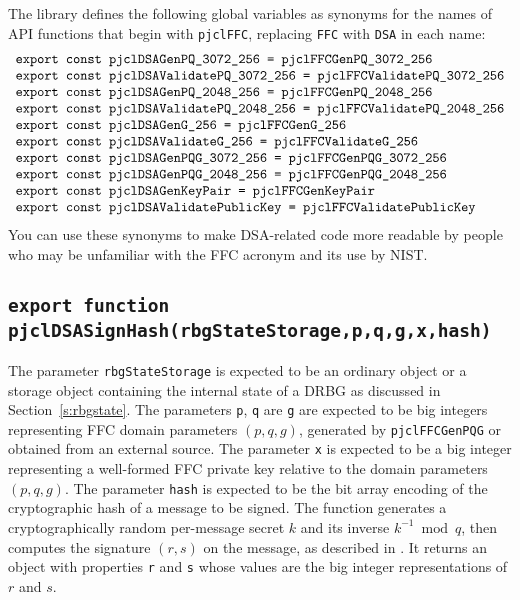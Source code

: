 \documentclass[12pt]{article}
\begin{document}
The library defines the following global variables as 
synonyms for the names of API functions that begin with {\tt pjclFFC},
replacing {\tt FFC} with {\tt DSA} in each name:
$$
\begin{array}{l}
\mbox{\tt export const pjclDSAGenPQ\_3072\_256 = pjclFFCGenPQ\_3072\_256}\\
\mbox{\tt export const pjclDSAValidatePQ\_3072\_256 = pjclFFCValidatePQ\_3072\_256}\\
\mbox{\tt export const pjclDSAGenPQ\_2048\_256 = pjclFFCGenPQ\_2048\_256}\\
\mbox{\tt export const pjclDSAValidatePQ\_2048\_256 = pjclFFCValidatePQ\_2048\_256}\\
\mbox{\tt export const pjclDSAGenG\_256 = pjclFFCGenG\_256}\\
\mbox{\tt export const pjclDSAValidateG\_256 = pjclFFCValidateG\_256}\\
\mbox{\tt export const pjclDSAGenPQG\_3072\_256 = pjclFFCGenPQG\_3072\_256}\\
\mbox{\tt export const pjclDSAGenPQG\_2048\_256 = pjclFFCGenPQG\_2048\_256}\\
\mbox{\tt export const pjclDSAGenKeyPair = pjclFFCGenKeyPair}\\
\mbox{\tt export const pjclDSAValidatePublicKey = pjclFFCValidatePublicKey}
\end{array}
$$
You can use these synonyms to make DSA-related code more readable by people 
who may be unfamiliar with the FFC acronym and its use
by NIST.

\subsection{\tt export function pjclDSASignHash(rbgStateStorage,p,q,g,x,hash)}

The parameter {\tt rbgStateStorage} is expected to be an ordinary
object or a storage object containing the internal state of a DRBG 
as discussed in Section~\ref{s:rbgstate}.
The parameters {\tt p}, {\tt q} are {\tt g}
are expected to be big integers representing FFC domain parameters $(p,q,g)$,
generated by {\tt pjclFFCGenPQG} or obtained from an external source.
The parameter {\tt x} is expected to be a big integer representing a 
well-formed FFC private key relative to the domain parameters $(p,q,g)$.
The parameter {\tt hash} is expected to be the bit array encoding of the
cryptographic hash of a message to be signed.  The function 
generates a cryptographically random per-message secret $k$ and its inverse $k^{-1} \bmod q$, then
computes the signature $(r,s)$ on the message,
as described in \cite[Section~4.6]{DSS-4}.
It returns an object
with properties {\tt r} and {\tt s} whose values are the big integer representations 
of $r$ and $s$.
\end{document}
